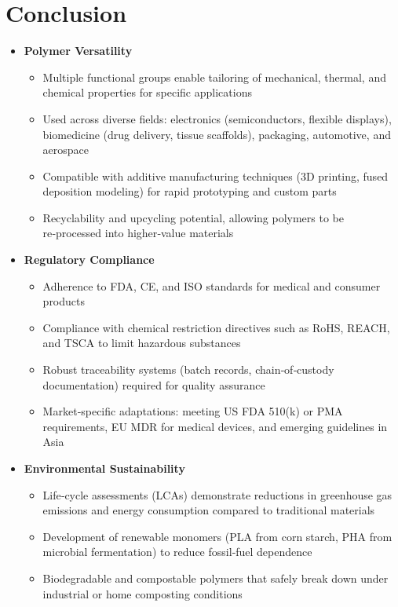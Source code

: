 \documentclass[11pt,a4paper]{article}
\begin{document}
\section{Conclusion}

\begin{itemize}
\item \textbf{Polymer Versatility}
  \begin{itemize}
\item Multiple functional groups enable tailoring of mechanical, thermal, and chemical properties for specific applications
\item Used across diverse fields: electronics (semiconductors, flexible displays), biomedicine (drug delivery, tissue scaffolds), packaging, automotive, and aerospace
\item Compatible with additive manufacturing techniques (3D printing, fused deposition modeling) for rapid prototyping and custom parts
\item Recyclability and upcycling potential, allowing polymers to be re‑processed into higher‑value materials
  \end{itemize}
\item \textbf{Regulatory Compliance}
  \begin{itemize}
\item Adherence to FDA, CE, and ISO standards for medical and consumer products
\item Compliance with chemical restriction directives such as RoHS, REACH, and TSCA to limit hazardous substances
\item Robust traceability systems (batch records, chain‑of‑custody documentation) required for quality assurance
\item Market‑specific adaptations: meeting US FDA 510(k) or PMA requirements, EU MDR for medical devices, and emerging guidelines in Asia
  \end{itemize}
\item \textbf{Environmental Sustainability}
  \begin{itemize}
\item Life‑cycle assessments (LCAs) demonstrate reductions in greenhouse gas emissions and energy consumption compared to traditional materials
\item Development of renewable monomers (PLA from corn starch, PHA from microbial fermentation) to reduce fossil‑fuel dependence
\item Biodegradable and compostable polymers that safely break down under industrial or home composting conditions

\end{itemize}
\end{itemize}
\end{document}
